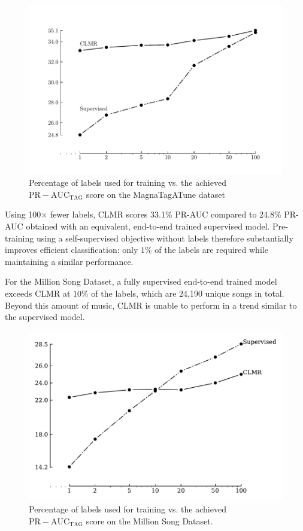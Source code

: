 \begin{figure}[h]
    \centering
    \includegraphics[width=\columnwidth]{figs/perc_train_data_magnatagatune.pdf}
    \caption{Percentage of labels used for training vs. the achieved $\mathrm{PR-AUC}_{\mathrm{TAG}}$ score on the MagnaTagATune dataset}
    \label{fig:perc_train_data_magnatagatune}
\end{figure}


Using 100$\times$ fewer labels, CLMR scores 33.1\% PR-AUC compared to 24.8\% PR-AUC obtained with an equivalent, end-to-end trained supervised model.
Pre-training using a self-supervised objective without labels therefore substantially improves efficient classification: only $1\%$ of the labels are required while maintaining a similar performance.

For the Million Song Dataset, a fully supervised end-to-end trained model exceeds CLMR at $10\%$ of the labels, which are 24,190 unique songs in total. Beyond this amount of music, CLMR is unable to perform in a trend similar to the supervised model.

\begin{figure}[h]
    \centering
    \includegraphics[width=\columnwidth]{figs/perc_train_data_msd.pdf}
    \caption{Percentage of labels used for training vs. the achieved $\mathrm{PR-AUC}_{\mathrm{TAG}}$ score on the Million Song Dataset.}
    \label{fig:perc_train_data_msd}
\end{figure}




